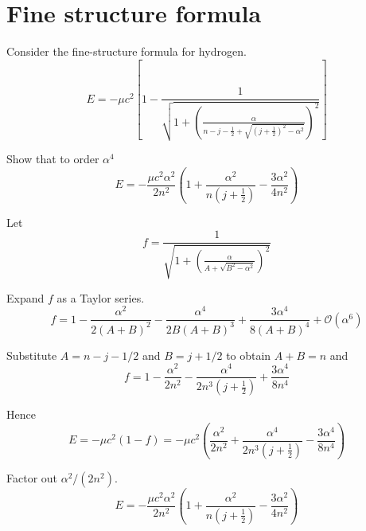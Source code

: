 

\section*{Fine structure formula}

Consider the fine-structure formula for hydrogen.
\begin{equation*}
E=-\mu c^2\left[1-\frac{1}{\sqrt{\displaystyle1
+\left(\frac{\alpha}{n-j-\frac{1}{2}+\sqrt{\left(j+\frac{1}{2}\right)^2-\alpha^2}}\right)^2}}\right]
\end{equation*}

Show that to order $\alpha^4$
\begin{equation*}
E=-\frac{\mu c^2\alpha^2}{2n^2}
\left(1+\frac{\alpha^2}{n\left(j+\frac{1}{2}\right)}-\frac{3\alpha^2}{4n^2}\right)
\end{equation*}

Let
\begin{equation*}
f=\frac{1}{\sqrt{\displaystyle1+\left(\frac{\alpha}{A+\sqrt{B^2-\alpha^2}}\right)^2}}
\end{equation*}

Expand $f$ as a Taylor series.
\begin{equation*}
f=1-\frac{\alpha^2}{2(A+B)^2}-\frac{\alpha^4}{2B(A+B)^3}+\frac{3\alpha^4}{8(A+B)^4}+\mathcal O(\alpha^6)
\end{equation*}

Substitute $A=n-j-1/2$ and $B=j+1/2$ to obtain $A+B=n$ and
\begin{equation*}
f=1-\frac{\alpha^2}{2n^2}-\frac{\alpha^4}{2n^3\left(j+\frac{1}{2}\right)}+\frac{3\alpha^4}{8n^4}
\tag{1}
\end{equation*}

Hence
\begin{equation*}
E=-\mu c^2(1-f)=-\mu c^2\left(\frac{\alpha^2}{2n^2}
+\frac{\alpha^4}{2n^3\left(j+\frac{1}{2}\right)}-\frac{3\alpha^4}{8n^4}\right)
\end{equation*}

Factor out $\alpha^2/(2n^2)$.
\begin{equation*}
E=-\frac{\mu c^2\alpha^2}{2n^2}
\left(1+\frac{\alpha^2}{n\left(j+\frac{1}{2}\right)}-\frac{3\alpha^2}{4n^2}\right)
\tag{2}
\end{equation*}


